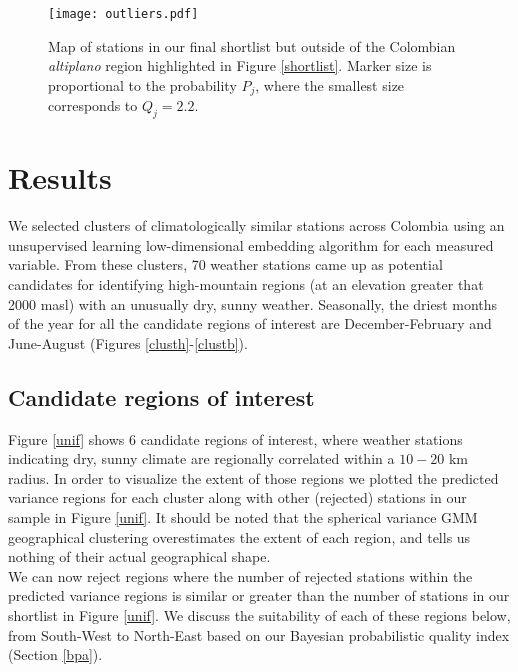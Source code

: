 \documentclass[12pt]{iopart}
\begin{document}
\begin{figure}
\begin{center}
\texttt{[image: outliers.pdf]}
\caption{Map of stations in our final shortlist but outside of the Colombian \emph{altiplano} region highlighted in Figure \ref{shortlist}. Marker size is proportional to the probability $P_j$, where the smallest size corresponds to $Q_j=2.2$.}\label{outliers}
\end{center}
\end{figure}



\section{Results}

We selected clusters of climatologically similar stations across Colombia using an unsupervised learning low-dimensional embedding algorithm for each measured variable. From these clusters, 70 weather stations came up as potential candidates for identifying high-mountain regions (at an elevation greater that 2000 masl) with an unusually dry, sunny weather. Seasonally, the driest months of the year for all the candidate regions of interest are December-February and June-August (Figures \ref{clusth}-\ref{clustb}). 

\subsection{Candidate regions of interest}

Figure \ref{unif} shows 6 candidate regions of interest, where weather stations indicating dry, sunny climate are regionally correlated within a $10-20$ km radius. In order to visualize the extent of those regions we plotted the predicted variance regions for each cluster along with other (rejected) stations in our sample in Figure \ref{unif}. It should be noted that the spherical variance GMM geographical clustering overestimates the extent of each region, and tells us nothing of their actual geographical shape. \\

We can now reject regions where the number of rejected stations within the predicted variance regions is similar or greater than the number of stations in our shortlist in Figure \ref{unif}.  We discuss the suitability of each of these regions below, from South-West to North-East based on our Bayesian probabilistic quality index (Section \ref{bpa}).
\end{document}
